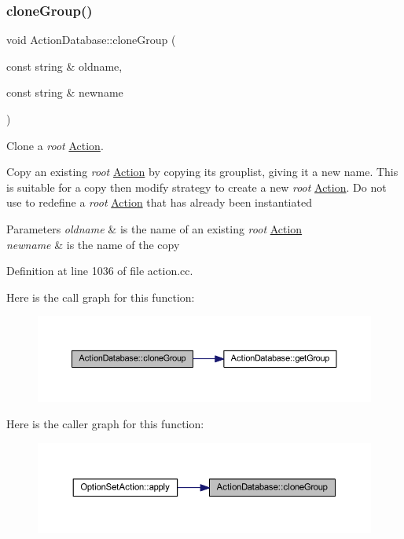 \subsubsection{\texorpdfstring{cloneGroup()}{cloneGroup()}}
{\footnotesize\ttfamily void Action\+Database\+::clone\+Group (\begin{DoxyParamCaption}\item[{const string \&}]{oldname,  }\item[{const string \&}]{newname }\end{DoxyParamCaption})}



Clone a {\itshape root} \mbox{\hyperlink{class_action}{Action}}. 

Copy an existing {\itshape root} \mbox{\hyperlink{class_action}{Action}} by copying its grouplist, giving it a new name. This is suitable for a copy then modify strategy to create a new {\itshape root} \mbox{\hyperlink{class_action}{Action}}. Do not use to redefine a {\itshape root} \mbox{\hyperlink{class_action}{Action}} that has already been instantiated 
\begin{DoxyParams}{Parameters}
{\em oldname} & is the name of an existing {\itshape root} \mbox{\hyperlink{class_action}{Action}} \\
\hline
{\em newname} & is the name of the copy \\
\hline
\end{DoxyParams}


Definition at line 1036 of file action.\+cc.

Here is the call graph for this function\+:
\nopagebreak
\begin{figure}[H]
\begin{center}
\leavevmode
\includegraphics[width=350pt]{class_action_database_a8a73393a21e7ae50bcdb138eab1dcaff_cgraph}
\end{center}
\end{figure}
Here is the caller graph for this function\+:
\nopagebreak
\begin{figure}[H]
\begin{center}
\leavevmode
\includegraphics[width=350pt]{class_action_database_a8a73393a21e7ae50bcdb138eab1dcaff_icgraph}
\end{center}
\end{figure}
\mbox{\label{class_action_database_af5fcde4af3947f6e02fd7fd4cf9e2ecc}} 
